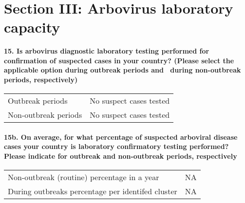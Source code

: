 \documentclass[
]{article}
\begin{document}
\hypertarget{section-iii-arbovirus-laboratory-capacity}{%
\section{Section III: Arbovirus laboratory
capacity}\label{section-iii-arbovirus-laboratory-capacity}}

\hypertarget{is-arbovirus-diagnostic-laboratory-testing-performed-for-confirmation-of-suspected-cases-in-your-country-please-select-the-applicable-option-during-outbreak-periods-and-during-non-outbreak-periods-respectively}{%
\paragraph{15. Is arbovirus diagnostic laboratory testing performed for
confirmation of suspected cases in your country? (Please select the
applicable option during outbreak periods and ~during non-outbreak
periods,
respectively)}\label{is-arbovirus-diagnostic-laboratory-testing-performed-for-confirmation-of-suspected-cases-in-your-country-please-select-the-applicable-option-during-outbreak-periods-and-during-non-outbreak-periods-respectively}}

\begin{longtable}[]{@{}ll@{}}
\toprule
\endhead
Outbreak periods & No suspect cases tested \\
Non-outbreak periods & No suspect cases tested \\
\bottomrule
\end{longtable}

\hypertarget{b.-on-average-for-what-percentage-of-suspected-arboviral-disease-cases-your-country-is-laboratory-confirmatory-testing-performed-please-indicate-for-outbreak-and-non-outbreak-periods-respectively}{%
\paragraph{15b. On average, for what percentage of suspected arboviral
disease cases your country is laboratory confirmatory testing performed?
Please indicate for outbreak and non-outbreak periods,
respectively}\label{b.-on-average-for-what-percentage-of-suspected-arboviral-disease-cases-your-country-is-laboratory-confirmatory-testing-performed-please-indicate-for-outbreak-and-non-outbreak-periods-respectively}}

\begin{longtable}[]{@{}lr@{}}
\toprule
\endhead
Non-outbreak (routine) percentage in a year & NA \\
During outbreaks percentage per identifed cluster & NA \\
\bottomrule
\end{longtable}
\end{document}
